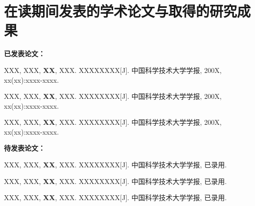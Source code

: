 
\chapter{在读期间发表的学术论文与取得的研究成果}

\textbf{已发表论文：}

\begin{publications}

\item
XXX, XXX, \textbf{XX}, XXX. XXXXXXXX[J]. 中国科学技术大学学报, 200X, xx(xx):xxxx-xxxx.

\item
XXX, XXX, \textbf{XX}, XXX. XXXXXXXX[J]. 中国科学技术大学学报, 200X, xx(xx):xxxx-xxxx.

\item
XXX, XXX, \textbf{XX}, XXX. XXXXXXXX[J]. 中国科学技术大学学报, 200X, xx(xx):xxxx-xxxx.

\end{publications}

\vskip 1cm

\textbf{待发表论文：}

\begin{publications}

\item
XXX, XXX, \textbf{XX}, XXX. XXXXXXXX[J]. 中国科学技术大学学报, 已录用.

\item
XXX, XXX, \textbf{XX}, XXX. XXXXXXXX[J]. 中国科学技术大学学报, 已录用.

\item
XXX, XXX, \textbf{XX}, XXX. XXXXXXXX[J]. 中国科学技术大学学报, 已录用.

\end{publications}